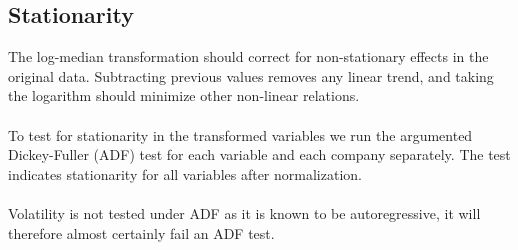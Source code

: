 \clearpage

\subsection*{Stationarity}

The log-median transformation should correct for non-stationary effects in the original data. 
Subtracting previous values removes any linear trend, and taking the logarithm should minimize other non-linear relations. 
\\\\
To test for stationarity in the transformed variables we run the argumented Dickey-Fuller (ADF) test for each variable and each company separately. The test indicates stationarity for all variables after normalization. 
\\\\
Volatility is not tested under ADF as it is known to be autoregressive, it will therefore almost certainly fail an ADF test. 










